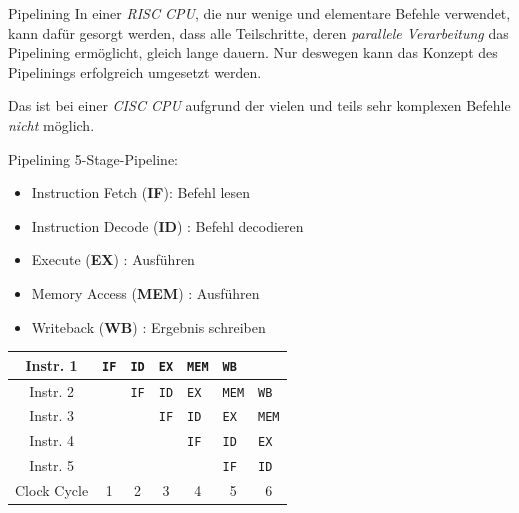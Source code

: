 \documentclass[german]{spicker}
\begin{document}
\begin{defi}{Pipelining}
    In einer \emph{RISC CPU}, die nur wenige und elementare Befehle verwendet, kann dafür
    gesorgt werden, dass alle Teilschritte, deren \emph{parallele Verarbeitung} das Pipelining
    ermöglicht, gleich lange dauern. Nur deswegen kann das Konzept des Pipelinings
    erfolgreich umgesetzt werden.

    Das ist bei einer \emph{CISC CPU} aufgrund der vielen
    und teils sehr komplexen Befehle \emph{nicht} möglich.
\end{defi}

\begin{example}{Pipelining}
    5-Stage-Pipeline:
    \begin{itemize}
        \item Instruction Fetch (\textbf{IF}): Befehl lesen
        \item Instruction Decode (\textbf{ID}) : Befehl decodieren
        \item Execute (\textbf{EX}) : Ausführen
        \item Memory Access (\textbf{MEM}) : Ausführen
        \item Writeback (\textbf{WB}) : Ergebnis schreiben
    \end{itemize}

    \begin{center}
        \begin{tabular}{| c || m{} | m{} | m{} | m{} | m{} | m{} |}
            \hline
            Instr. 1    & \texttt{IF}            & \texttt{ID}            & \texttt{EX}            & \texttt{MEM}           & \texttt{WB}            &                        \\
            \hline
            Instr. 2    &                        & \texttt{IF}            & \texttt{ID}            & \texttt{EX}            & \texttt{MEM}           & \texttt{WB}            \\
            \hline
            Instr. 3    &                        &                        & \texttt{IF}            & \texttt{ID}            & \texttt{EX}            & \texttt{MEM}           \\
            \hline
            Instr. 4    &                        &                        &                        & \texttt{IF}            & \texttt{ID}            & \texttt{EX}            \\
            \hline
            Instr. 5    &                        &                        &                        &                        & \texttt{IF}            & \texttt{ID}            \\
            \hline
            \hline
            Clock Cycle & \multicolumn{1}{c|}{1} & \multicolumn{1}{c|}{2} & \multicolumn{1}{c|}{3} & \multicolumn{1}{c|}{4} & \multicolumn{1}{c|}{5} & \multicolumn{1}{c|}{6} \\
            \hline
        \end{tabular}
    \end{center}
\end{example}
\end{document}
